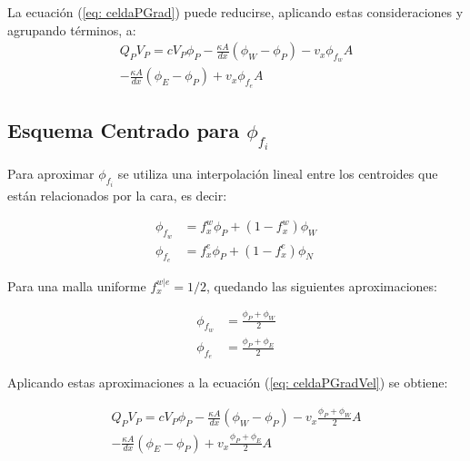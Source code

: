 \documentclass{article}
\begin{document}
    La ecuación (\ref{eq: celdaPGrad}) puede reducirse, aplicando estas consideraciones y agrupando términos, a:
    \begin{multline}
    	    Q_P V_P = c  V_P \phi_P - \frac{\kappa A}{dx} \left( \phi_W - \phi_P \right) - v_x \phi_{f_w} A \\
    	        - \frac{\kappa A}{dx} \left( \phi_E - \phi_P \right) + v_x \phi_{f_e} A
            \label{eq: celdaPGradVel}
    \end{multline}
    
        \subsection{Esquema Centrado para $\phi_{f_i}$}

        Para aproximar $\phi_{f_i}$ se utiliza una interpolación lineal entre los centroides que están relacionados por la cara, es decir:

        \begin{equation*}
            \begin{aligned}
                \phi_{f_w} &= f_x^w \phi_P + (1 - f_x^w) \phi_W \\
                \phi_{f_e} &= f_x^e \phi_P + (1 - f_x^e) \phi_N
            \end{aligned}
        \end{equation*}

        Para una malla uniforme $f_x^{w|e} = 1/2$, quedando las siguientes aproximaciones:

        \begin{equation*}
            \begin{aligned}
                \phi_{f_w} &= \frac{\phi_P +  \phi_W}{2} \\
                \phi_{f_e} &= \frac{\phi_P +  \phi_E}{2}
			\end{aligned}
        \end{equation*}

        Aplicando estas aproximaciones a la ecuación (\ref{eq: celdaPGradVel}) se obtiene:

        \begin{multline}
    	    Q_P V_P = c  V_P \phi_P - \frac{\kappa A}{dx} \left( \phi_W - \phi_P \right) - v_x \frac{\phi_P +  \phi_W}{2} A \\ 
			- \frac{\kappa A}{dx} \left( \phi_E - \phi_P \right) + v_x \frac{\phi_P +  \phi_E}{2} A
        \end{multline}
            
\end{document}
